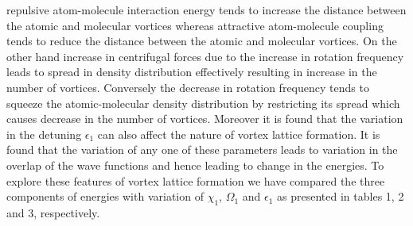 \documentclass[10pt,a4paper]{article}
\begin{document}
repulsive atom-molecule interaction energy tends to increase the
distance between the atomic and molecular vortices whereas
attractive atom-molecule coupling tends to reduce the distance
between the atomic and molecular vortices. On the other hand
increase in centrifugal forces due to the increase in rotation
frequency leads to spread in density distribution effectively
resulting in increase in the number of vortices. Conversely the
decrease in rotation frequency tends to squeeze the
atomic-molecular density distribution by restricting its spread
which causes decrease in the number of vortices. Moreover it is
found that the variation in the detuning $\epsilon_1$ can also
affect the nature of vortex lattice formation. It is found that
the variation of any one of these parameters leads to variation in
the overlap of the wave functions and hence leading to change in
the energies. To explore these features of vortex lattice
formation we have compared the three components of energies with
variation of $\chi_1$, $\Omega_1$ and $\epsilon_1$ as presented in
tables 1, 2 and 3, respectively.
\end{document}
